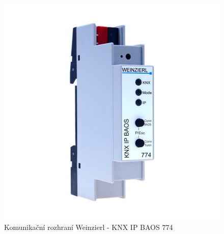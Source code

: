 \begin{figure}[!ht]
  \begin{center}
    \includegraphics[scale=0.2]{obrazky/IP BAOS.jpg}
  \end{center}
  \caption[Komunikační rozhraní Weinzierl - KNX IP BAOS 774 \cite{Weinzier ob}]{Komunikační rozhraní Weinzierl - KNX IP BAOS 774 \cite{Weinzier ob}}
  \label{fig:Komunikační rozhraní Weinzierl - KNX IP BAOS 774}
\end{figure}
\pagebreak

